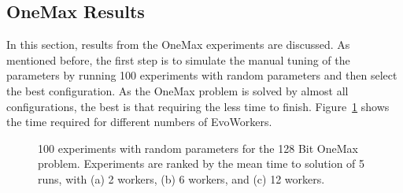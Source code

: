 \documentclass{llncs}
\begin{document}
\subsection{OneMax Results}
In this section, results from the OneMax experiments are discussed. As mentioned before, the first
step is to simulate the manual tuning of the parameters by running 100 experiments with random 
parameters and then select the best configuration. As the OneMax problem is solved by almost 
all configurations, the best is that requiring the less time to finish. Figure~\ref{fig:effort} 
shows the time required for different numbers of EvoWorkers.    

\begin{figure}[b]
    \centering

    \caption{100 experiments with random parameters for the 128 Bit OneMax problem.
    Experiments are ranked by the mean time to solution of 5 runs, with   
    (a) 2 workers, (b) 6 workers, and (c) 12 workers.}
    \label{fig:effort}
\end{figure}
\end{document}
